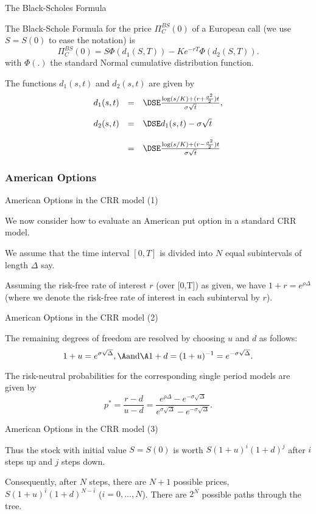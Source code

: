 {The Black-Scholes Formula}

\item The Black-Schole Formula for the price $\Pi_C^{BS}(0)$ of a European call  (we use
$S=S(0)$ to ease the notation) is
\begin{equation}\label{BScallprice4}
\Pi_C^{BS}(0) = S \Phi(d_1(S, T)) - K e^{-rT} \Phi(d_2(S, T)).
\end{equation}
with $\Phi(.)$ the standard Normal cumulative distribution function.
\item The functions $d_1(s,t)$ and $d_2(s,t)$ are given by
$$
\begin{array}{lll}
d_1(s,t) &=&\DSE \frac{\log(s/K) + (r +
\frac{\sigma^2}{2})t}{\sigma \sqrt{t}},\\*[12pt] d_2(s,t) &=&\DSE
d_1(s,t) -\sigma \sqrt{t}\\*[12pt]
&=&\DSE \frac{\log(s/K) + (r -
\frac{\sigma^2}{2})t}{\sigma \sqrt{t}}
\end{array}
$$

\subsubsection{American Options}

{ American Options in the CRR model (1)}
  \item We now consider how to evaluate an American put option in a
standard CRR model.
\item We assume that the time interval $[0,T]$ is
divided into $N$ equal subintervals of length $\Delta $ say.
\item Assuming the risk-free rate of interest $r$ (over [0,T]) as given,
we have $1+r = e^{\rho \Delta}$ (where we denote the risk-free
rate of interest in each subinterval by $r$).

{ American Options in the CRR model (2)}
  \item The remaining
degrees of freedom are resolved by choosing $u$ and $d$ as
follows:
$$
1+u= e^{\sigma \sqrt{\Delta}}, \A \mbox{and} \A 1+d = (1+u)^{-1} =
e^{-\sigma \sqrt{\Delta}}.
$$
\item
The risk-neutral probabilities for
the corresponding single period models are given by
$$
p^*= \frac{r-d}{u-d} = \frac{e^{\rho \Delta}-e^{-\sigma
\sqrt{\Delta}}} {e^{\sigma \sqrt{\Delta}}-e^{-\sigma
\sqrt{\Delta}}}.
$$

{ American Options in the CRR model (3)}
  \item Thus the stock with initial value $S = S(0)$ is worth $S (1+u)^i
(1+d)^j$ after $i$ steps up and $j$ steps down.
\item Consequently,
after $N$ steps, there are $N+1$ possible prices, $S (1+u)^i
(1+d)^{N-i}$ ($i = 0, \ldots, N$). There are $2^N$ possible paths
through the tree.

